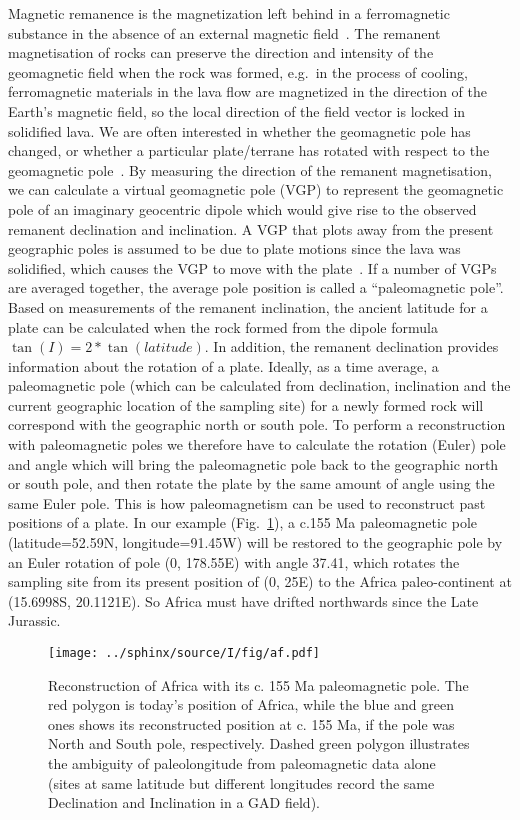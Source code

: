 Magnetic remanence is the magnetization left behind in a ferromagnetic substance
in the absence of an external magnetic field~\cite{T19}. The remanent
magnetisation of rocks can preserve the direction and intensity of the
geomagnetic field when the rock was formed, e.g.\ in the process of cooling,
ferromagnetic materials in the lava flow are magnetized in the direction of the
Earth's magnetic field, so the local direction of the field vector is locked in
solidified lava. We are often interested in whether the geomagnetic pole has
changed, or whether a particular plate/terrane has rotated with respect to the
geomagnetic pole~\cite{T19}. By measuring the direction of the remanent
magnetisation, we can calculate a virtual geomagnetic pole (VGP) to represent
the geomagnetic pole of an imaginary geocentric dipole which would give rise to
the observed remanent declination and inclination. A VGP that plots away from
the present geographic poles is assumed to be due to plate motions since the
lava was solidified, which causes the VGP to move with the plate~\cite{T08}. If
a number of VGPs are averaged together, the average pole position is called a
``paleomagnetic pole''. Based on measurements of the remanent inclination, the
ancient latitude for a plate can be calculated when the rock formed from the
dipole formula $\tan(I) = 2 *\tan(latitude)$. In addition, the remanent
declination provides information about the rotation of a plate. Ideally, as a
time average, a paleomagnetic pole (which can be calculated from declination,
inclination and the current geographic location of the sampling site) for a
newly formed rock will correspond with the geographic north or south pole. To
perform a reconstruction with paleomagnetic poles we therefore have to calculate
the rotation (Euler) pole and angle which will bring the paleomagnetic pole back
to the geographic north or south pole, and then rotate the plate by the same
amount of angle using the same Euler pole. This is how paleomagnetism can be
used to reconstruct past positions of a plate. In our example
(Fig.~\ref{Fig:chap_intro_reconstructpole}), a c.155 Ma paleomagnetic pole
(latitude=52.59\degree{}N, longitude=91.45\degree{}W) will be restored to the
geographic pole by an Euler rotation of pole (0\degree, 178.55\degree{}E) with
angle 37.41\degree, which rotates the sampling site from its present position of
(0\degree, 25\degree{}E) to the Africa paleo-continent at (15.6998\degree{}S,
20.1121\degree{}E). So Africa must have drifted northwards since the Late
Jurassic.

\begin{figure}
  \centering
    \texttt{[image: ../sphinx/source/I/fig/af.pdf]}
  \captionsetup{width=.95\textwidth}
  \caption{Reconstruction of Africa with its c. 155 Ma paleomagnetic pole. The
  red polygon is today's position of Africa, while the blue and green ones shows
  its reconstructed position at c. 155 Ma, if the pole was North and South pole,
  respectively. Dashed green polygon illustrates the ambiguity of paleolongitude
  from paleomagnetic data alone (sites at same latitude but different longitudes
  record the same Declination and Inclination in a GAD
  field).}\label{Fig:chap_intro_reconstructpole}
\end{figure}

